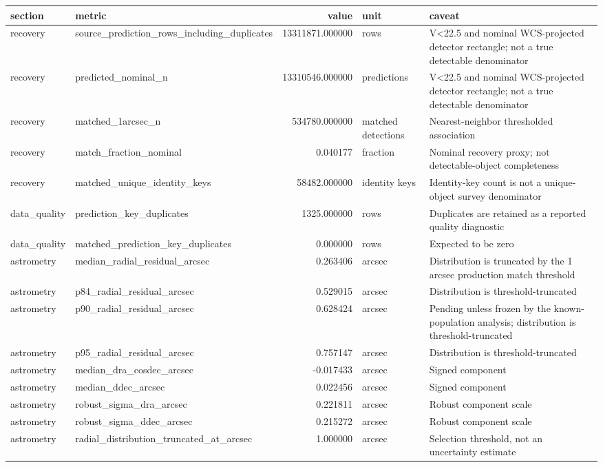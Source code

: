 \begin{tabular}{llrll}
\toprule
section & metric & value & unit & caveat \\
\midrule
recovery & source\_prediction\_rows\_including\_duplicates & 13311871.000000 & rows & V<22.5 and nominal WCS-projected detector rectangle; not a true detectable denominator \\
recovery & predicted\_nominal\_n & 13310546.000000 & predictions & V<22.5 and nominal WCS-projected detector rectangle; not a true detectable denominator \\
recovery & matched\_1arcsec\_n & 534780.000000 & matched detections & Nearest-neighbor thresholded association \\
recovery & match\_fraction\_nominal & 0.040177 & fraction & Nominal recovery proxy; not detectable-object completeness \\
recovery & matched\_unique\_identity\_keys & 58482.000000 & identity keys & Identity-key count is not a unique-object survey denominator \\
data\_quality & prediction\_key\_duplicates & 1325.000000 & rows & Duplicates are retained as a reported quality diagnostic \\
data\_quality & matched\_prediction\_key\_duplicates & 0.000000 & rows & Expected to be zero \\
astrometry & median\_radial\_residual\_arcsec & 0.263406 & arcsec & Distribution is truncated by the 1 arcsec production match threshold \\
astrometry & p84\_radial\_residual\_arcsec & 0.529015 & arcsec & Distribution is threshold-truncated \\
astrometry & p90\_radial\_residual\_arcsec & 0.628424 & arcsec & Pending unless frozen by the known-population analysis; distribution is threshold-truncated \\
astrometry & p95\_radial\_residual\_arcsec & 0.757147 & arcsec & Distribution is threshold-truncated \\
astrometry & median\_dra\_cosdec\_arcsec & -0.017433 & arcsec & Signed component \\
astrometry & median\_ddec\_arcsec & 0.022456 & arcsec & Signed component \\
astrometry & robust\_sigma\_dra\_arcsec & 0.221811 & arcsec & Robust component scale \\
astrometry & robust\_sigma\_ddec\_arcsec & 0.215272 & arcsec & Robust component scale \\
astrometry & radial\_distribution\_truncated\_at\_arcsec & 1.000000 & arcsec & Selection threshold, not an uncertainty estimate \\

\end{tabular}
